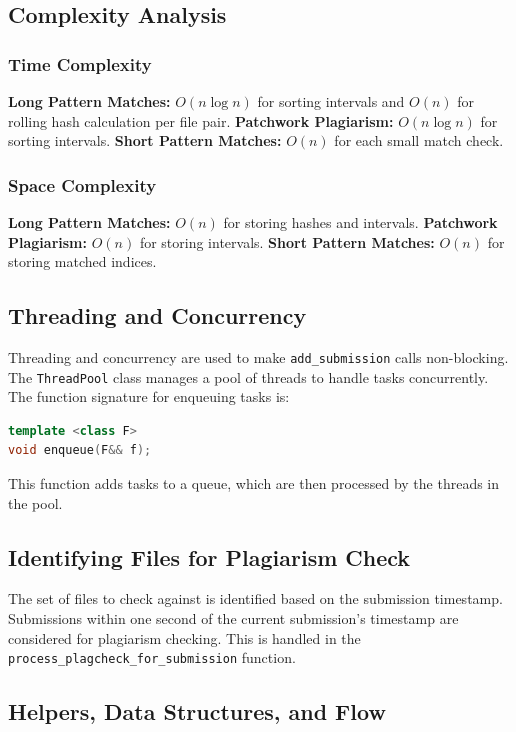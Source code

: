 \documentclass{article}
\begin{document}
\subsection{Complexity Analysis}

\subsubsection{Time Complexity}
\textbf{Long Pattern Matches:} \(O(n \log n)\) for sorting intervals and \(O(n)\) for rolling hash calculation per file pair. \textbf{Patchwork Plagiarism:} \(O(n \log n)\) for sorting intervals. \textbf{Short Pattern Matches:} \(O(n)\) for each small match check.

\subsubsection{Space Complexity}
\textbf{Long Pattern Matches:} \(O(n)\) for storing hashes and intervals. \textbf{Patchwork Plagiarism:} \(O(n)\) for storing intervals. \textbf{Short Pattern Matches:} \(O(n)\) for storing matched indices.

\subsection{Threading and Concurrency}
Threading and concurrency are used to make \texttt{add\_submission} calls non-blocking. The \texttt{ThreadPool} class manages a pool of threads to handle tasks concurrently. The function signature for enqueuing tasks is:
\begin{lstlisting}[language=C++]
template <class F>
void enqueue(F&& f);
\end{lstlisting}
This function adds tasks to a queue, which are then processed by the threads in the pool.

\subsection{Identifying Files for Plagiarism Check}
The set of files to check against is identified based on the submission timestamp. Submissions within one second of the current submission's timestamp are considered for plagiarism checking. This is handled in the \texttt{process\_plagcheck\_for\_submission} function.

\subsection{Helpers, Data Structures, and Flow}
\end{document}

